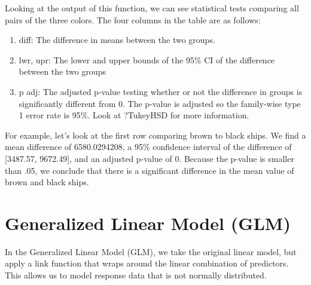 \documentclass{tufte-book}\usepackage[]{graphicx}\usepackage[]{color}
\begin{document}
Looking at the output of this function, we can see statistical tests comparing all pairs of the three colors. The four columns in the table are as follows:

\begin{enumerate}
  \item diff: The difference in means between the two groups.
  \item lwr, upr: The lower and upper bounds of the 95\% CI of the difference between the two groups
  \item p adj: The adjusted p-value testing whether or not the difference in groups is significantly different from 0. The p-value is adjusted so the family-wise type 1 error rate is 95\%. Look at ?TukeyHSD for more information.
\end{enumerate}

For example, let's look at the first row comparing brown to black ships. We find a mean difference of 6580.0294208, a 95\% confidence interval of the difference of [3487.57, 9672.49], and an adjusted p-value of 0. Because the p-value is smaller than .05, we conclude that there is a significant difference in the mean value of brown and black ships.

\section{Generalized Linear Model (GLM)}

In the Generalized Linear Model (GLM), we take the original linear model, but apply a link function that wraps around the linear combination of predictors. This allows us to model response data that is not normally distributed.
\end{document}
